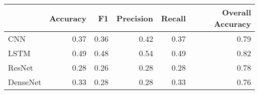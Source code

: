 \begin{tabular}{lrrrrr}
\toprule
{} &  Accuracy &    F1 &  Precision &  Recall &  Overall Accuracy \\
\midrule
CNN      &      0.37 &  0.36 &       0.42 &    0.37 &              0.79 \\
LSTM     &      0.49 &  0.48 &       0.54 &    0.49 &              0.82 \\
ResNet   &      0.28 &  0.26 &       0.28 &    0.28 &              0.78 \\
DenseNet &      0.33 &  0.28 &       0.28 &    0.33 &              0.76 \\
\bottomrule
\end{tabular}

